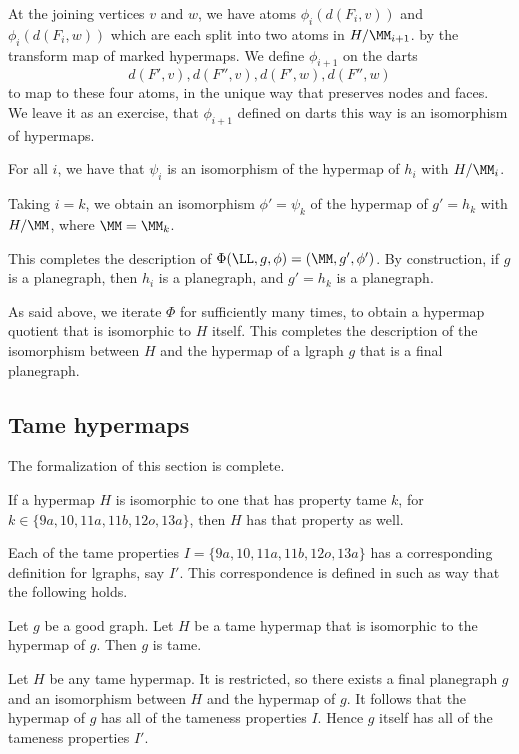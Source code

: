 At the joining vertices $v$ and $w$, we have atoms $\phi_i(d(F_i,v))$
and $\phi_i(d(F_i,w))$ which are each split into two atoms in
$H/\MM_{i+1}$.  by the transform map of marked hypermaps.  We define
$\phi_{i+1}$ on the darts
\[
d(F',v), d(F'',v), d(F',w), d(F'',w)
\]
to map to these four atoms, in the unique way that preserves nodes and
faces.  We leave it as an exercise, that $\phi_{i+1}$ defined on darts
this way is an isomorphism of hypermaps.

\begin{lemma} For all $i$, we have that 
$\psi_{i}$ is an isomorphism of the hypermap
of $h_{i}$  with $H/\MM_i$.
\end{lemma} 

Taking $i=k$, we obtain an isomorphism $\phi'=\psi_k$ of
the hypermap of $g'=h_k$ with $H/\MM$, where $\MM=\MM_k$.

This completes the description of $\Phi(\LL,g,\phi) = (\MM,g',\phi')$.
By construction, if $g$ is a planegraph, then $h_i$ is a planegraph,
and $g' = h_k$ is a planegraph.

As said above, we iterate $\Phi$ for sufficiently many times, to obtain a
hypermap quotient that is isomorphic to $H$ itself.
This completes the description of the isomorphism between
$H$ and the hypermap of a  lgraph $g$ that is a final planegraph.

\subsection{Tame hypermaps}

The formalization of this section is complete.

\begin{lemma} 
If a hypermap $H$ is isomorphic to one that has property
tame $k$, for $k\in \{9a, 10, 11a, 11b, 12o, 13a\}$, then
$H$ has that property as well.
\end{lemma} 

Each of the tame properties $I=\{9a,10,11a,11b,12o,13a\}$ has
a corresponding definition for lgraphs, say $I'$.  This correspondence is
defined in such as way that the following holds.

\begin{lemma}  Let $g$ be a good graph.  
Let $H$ be a tame hypermap that is isomorphic to the hypermap of $g$.
Then $g$ is tame.
\end{lemma} 

Let $H$ be any tame hypermap.  It is restricted, so there exists
a final planegraph $g$ and an isomorphism between $H$ and the
hypermap of $g$.  It follows that the hypermap of $g$ has all of
the tameness properties $I$.  Hence $g$ itself has all of the tameness
properties $I'$.  

